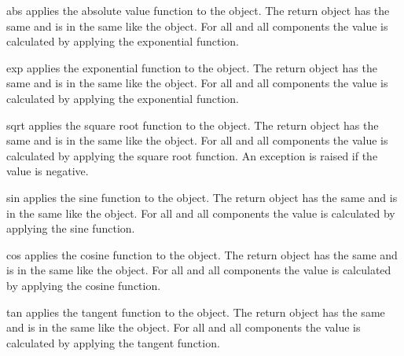 \begin{methoddesc}[Data]{abs}{} 
applies the absolute value function to the object. The
return \Data object has the same \Shape and is in the same
\FunctionSpace like the object. For all \DataSamplePoints and all
components the value is calculated by applying the exponential
function. 
\end{methoddesc}

\begin{methoddesc}[Data]{exp}{} 
applies the exponential function to the object. The
return \Data object has the same \Shape and is in the same
\FunctionSpace like the object. For all \DataSamplePoints and all
components the value is calculated by applying the exponential
function. 
\end{methoddesc}

\begin{methoddesc}[Data]{sqrt}{}
applies the square root function to the object. The
return \Data object has the same \Shape and is in the same
\FunctionSpace like the object. For all \DataSamplePoints and all
components the value is calculated by applying the square root function. 
An exception is
raised if the value is negative.  
\end{methoddesc}

\begin{methoddesc}[Data]{sin}{}
applies the sine function to the object. The
return \Data object has the same \Shape and is in the same
\FunctionSpace like the object. For all \DataSamplePoints and all
components the value is calculated by applying the sine function. 
\end{methoddesc}

\begin{methoddesc}[Data]{cos}{}
applies the cosine function to the object. The
return \Data object has the same \Shape and is in the same
\FunctionSpace like the object. For all \DataSamplePoints and all
components the value is calculated by applying the cosine function. 
\end{methoddesc}

\begin{methoddesc}[Data]{tan}{}
applies the tangent function to the object. The
return \Data object has the same \Shape and is in the same
\FunctionSpace like the object. For all \DataSamplePoints and all
components the value is calculated by applying the tangent function. 
\end{methoddesc}

